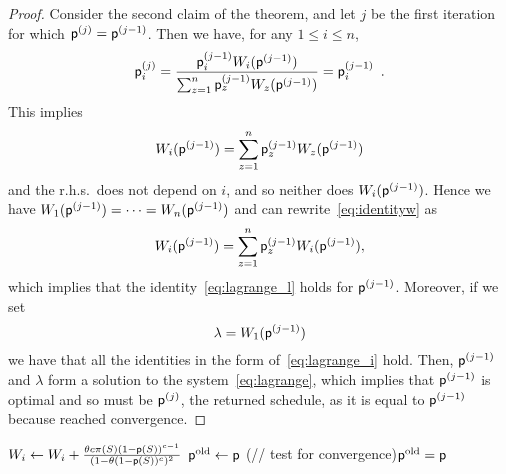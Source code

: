 \begin{proof}
	Consider the second claim of the theorem, and let $j$ be the
	first iteration for which $\mathsf{p}^{(j)}=\mathsf{p}^{(j-1)}$. Then we have, for
	any $1\le i\le n$,
	\[
		\mathsf{p}^{(j)}_i = \frac{\mathsf{p}^{(j-1)}_i W_i(\mathsf{p}^{(j-1)})}{\sum_{z=1}^n
		\mathsf{p}^{(j-1)}_z W_z(\mathsf{p}^{(j-1)})} = \mathsf{p}^{(j-1)}_i\enspace.
	\]
	This implies
	\begin{equation}\label{eq:identityw}
		W_i(\mathsf{p}^{(j-1)}) = \sum_{z=1}^n \mathsf{p}^{(j-1)}_z W_z(\mathsf{p}^{(j-1)})
	\end{equation}
	and the r.h.s.~does not depend on $i$, and so neither does
	$W_i(\mathsf{p}^{(j-1)})$. Hence we have
	$W_1(\mathsf{p}^{(j-1)})=\dotsb=W_n(\mathsf{p}^{(j-1)})$ and can
	rewrite~\eqref{eq:identityw} as
	\[
		W_i(\mathsf{p}^{(j-1)}) =  \sum_{z=1}^n \mathsf{p}^{(j-1)}_z
		W_i(\mathsf{p}^{(j-1)}),
	\]
	which implies that the identity~\eqref{eq:lagrange_l} holds for
	$\mathsf{p}^{(j-1)}$. Moreover, if we set
	\[
		\lambda = W_1(\mathsf{p}^{(j-1)})
	\]
	we have that all the identities in the form of~\eqref{eq:lagrange_i} hold.
	Then, $\mathsf{p}^{(j-1)}$ and $\lambda$ form a solution to the
	system~\eqref{eq:lagrange}, which implies that $\mathsf{p}^{(j-1)}$ is optimal
	and so must be $\mathsf{p}^{(j)}$, the returned schedule, as it is equal to
	$\mathsf{p}^{(j-1)}$ because \algoname reached convergence.
\end{proof}

\begin{algorithm}[ht]
	\DontPrintSemicolon
	 {
		 {\label{algline:sum}
			 {
				$W_i \leftarrow W_i + \frac{\theta c \pi(S) (1-\mathsf{p}(S))^{c-1}}{(1-\theta(1-\mathsf{p}(S))^c)^2}$\label{algline:w}\;
			}
		}
		$\mathsf{p}^{\mathrm{old}}\leftarrow \mathsf{p}$\;
		\If(// test for convergence){$\mathsf{p}^{\mathrm{old}} = \mathsf{p}$} {
			\KwBreak\;
		}
	}
	\Return{$\sched$}\;
	\caption{\algoname}
	\label{alg:iterative}
\end{algorithm}

